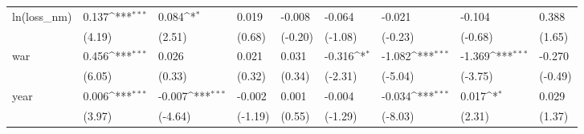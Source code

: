 \def\sym#1{\ifmmode^{#1}\else\(^{#1}\)\fi}
\begin{tabular}{p{1.5cm} p{2cm} p{1.7cm} p{1.7cm} p{1.7cm} p{1.7cm} p{1.7cm} p{1.7cm} p{1.7cm}}
\hline
ln(loss\_nm)     &    0.137\sym{***}&    0.084\sym{*}  &    0.019         &   -0.008         &   -0.064         &   -0.021         &   -0.104         &    0.388         \\
                &   (4.19)         &   (2.51)         &   (0.68)         &  (-0.20)         &  (-1.08)         &  (-0.23)         &  (-0.68)         &   (1.65)         \\
war             &    0.456\sym{***}&    0.026         &    0.021         &    0.031         &   -0.316\sym{*}  &   -1.082\sym{***}&   -1.369\sym{***}&   -0.270         \\
                &   (6.05)         &   (0.33)         &   (0.32)         &   (0.34)         &  (-2.31)         &  (-5.04)         &  (-3.75)         &  (-0.49)         \\
year            &    0.006\sym{***}&   -0.007\sym{***}&   -0.002         &    0.001         &   -0.004         &   -0.034\sym{***}&    0.017\sym{*}  &    0.029         \\
                &   (3.97)         &  (-4.64)         &  (-1.19)         &   (0.55)         &  (-1.29)         &  (-8.03)         &   (2.31)         &   (1.37)         \\
\end{tabular}
